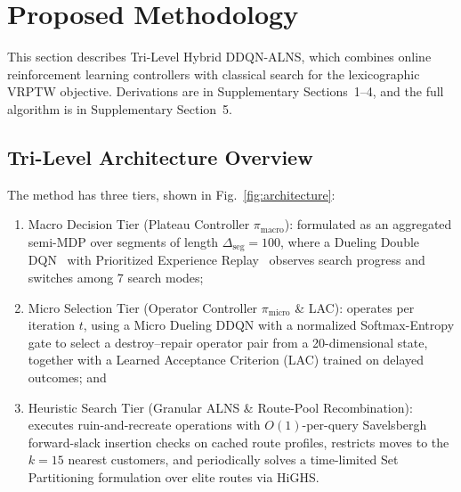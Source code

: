 \documentclass{ieeeaccess}
\begin{document}
\section{Proposed Methodology}
\label{sec:methodology}

This section describes Tri-Level Hybrid DDQN-ALNS, which combines online reinforcement learning controllers with classical search for the lexicographic VRPTW objective. Derivations are in Supplementary Sections~1--4, and the full algorithm is in Supplementary Section~5.

\subsection{Tri-Level Architecture Overview}
\label{sec:arch_overview}

The method has three tiers, shown in Fig.~\ref{fig:architecture}:
\begin{enumerate}
    \item Macro Decision Tier (Plateau Controller $\pi_{\text{macro}}$): formulated as an aggregated semi-MDP over segments of length $\Delta_{\text{seg}} = 100$, where a Dueling Double DQN~\cite{mnih2015human,vanhasselt2016deep} with Prioritized Experience Replay~\cite{schaul2016prioritized} observes search progress and switches among 7 search modes;
    \item Micro Selection Tier (Operator Controller $\pi_{\text{micro}}$ \& LAC): operates per iteration $t$, using a Micro Dueling DDQN with a normalized Softmax-Entropy gate to select a destroy--repair operator pair from a 20-dimensional state, together with a Learned Acceptance Criterion (LAC) trained on delayed outcomes; and
    \item Heuristic Search Tier (Granular ALNS \& Route-Pool Recombination): executes ruin-and-recreate operations with $O(1)$-per-query Savelsbergh forward-slack insertion checks on cached route profiles, restricts moves to the $k=15$ nearest customers, and periodically solves a time-limited Set Partitioning formulation over elite routes via HiGHS.
\end{enumerate}
\end{document}
